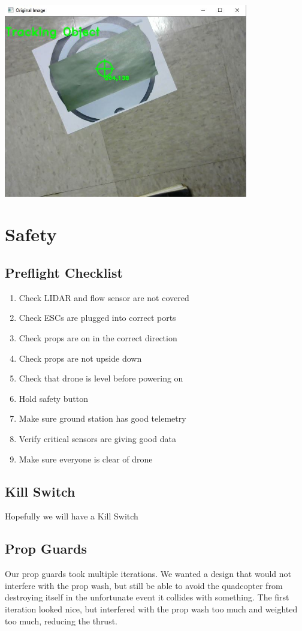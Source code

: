 \documentclass[12pt]{article}
\begin{document}
\begin{center}
\includegraphics[width=0.8\textwidth]{tracking}
\end{center}

\section{Safety}
\subsection{Preflight Checklist}
\begin{enumerate}
	\item Check LIDAR and flow sensor are not covered 
	\item Check ESCs are plugged into correct ports 
	\item Check props are on in the correct direction 
	\item Check props are not upside down
	\item Check that drone is level before powering on
	\item Hold safety button
	\item Make sure ground station has good telemetry
	\item Verify critical sensors are giving good data
	\item Make sure everyone is clear of drone 
\end{enumerate}

\subsection{Kill Switch}
Hopefully we will have a Kill Switch 

\subsection{Prop Guards}
Our prop guards took multiple iterations. We wanted a design that would not interfere with the prop wash, but still be able to avoid the quadcopter from destroying itself in the unfortunate event it collides with something. The first iteration looked nice, but interfered with the prop wash too much and weighted too much, reducing the thrust. 
\end{document}
